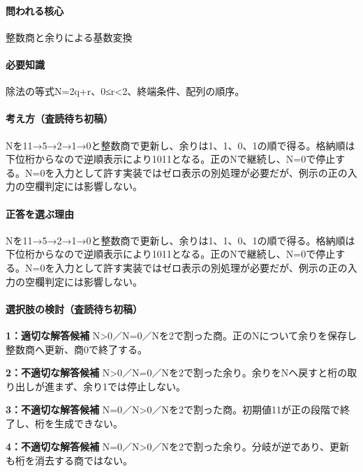 \paragraph{問われる核心} 整数商と余りによる基数変換

\paragraph{必要知識} 除法の等式N=\allowbreak{}2q+r、0≤r<2、終端条件、配列の順序。

\paragraph{考え方（査読待ち初稿）} Nを11→5→2→1→0と整数商で更新し、余りは1、1、0、1の順で得る。格納順は下位桁からなので逆順表示により1011となる。正のNで継続し、N=\allowbreak{}0で停止する。N=\allowbreak{}0を入力として許す実装ではゼロ表示の別処理が必要だが、例示の正の入力の空欄判定には影響しない。

\paragraph{正答を選ぶ理由} Nを11→5→2→1→0と整数商で更新し、余りは1、1、0、1の順で得る。格納順は下位桁からなので逆順表示により1011となる。正のNで継続し、N=\allowbreak{}0で停止する。N=\allowbreak{}0を入力として許す実装ではゼロ表示の別処理が必要だが、例示の正の入力の空欄判定には影響しない。

\paragraph{選択肢の検討（査読待ち初稿）}\mbox{}\par

\noindent\textbf{1：適切な解答候補} N>0／N=\allowbreak{}0／Nを2で割った商。正のNについて余りを保存し整数商へ更新、商0で終了する。\par

\noindent\textbf{2：不適切な解答候補} N>0／N=\allowbreak{}0／Nを2で割った余り。余りをNへ戻すと桁の取り出しが進まず、余り1では停止しない。\par

\noindent\textbf{3：不適切な解答候補} N=\allowbreak{}0／N>0／Nを2で割った商。初期値11が正の段階で終了し、桁を生成できない。\par

\noindent\textbf{4：不適切な解答候補} N=\allowbreak{}0／N>0／Nを2で割った余り。分岐が逆であり、更新も桁を消去する商ではない。\par

